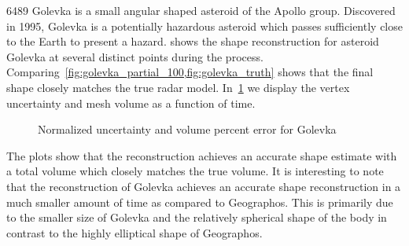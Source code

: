 \documentclass[journal]{new-aiaa}
\begin{document}
\num{6489} Golevka is a small angular shaped asteroid of the Apollo group.
Discovered in \num{1995}, Golevka is a potentially hazardous asteroid which passes sufficiently close to the Earth to present a hazard.
 shows the shape reconstruction for asteroid Golevka at several distinct points during the process.
Comparing~\cref{fig:golevka_partial_100,fig:golevka_truth} shows that the final shape closely matches the true radar model.
In~\cref{fig:golevka_metrics} we display the vertex uncertainty and mesh volume as a function of time.

\begin{figure}[htbp]
    \centering
    
    \caption{Normalized uncertainty and volume percent error for Golevka\label{fig:golevka_metrics}}
\end{figure}

The plots show that the reconstruction achieves an accurate shape estimate with a total volume which closely matches the true volume.
It is interesting to note that the reconstruction of Golevka achieves an accurate shape reconstruction in a much smaller amount of time as compared to Geographos.
This is primarily due to the smaller size of Golevka and the relatively spherical shape of the body in contrast to the highly elliptical shape of Geographos.
\end{document}

